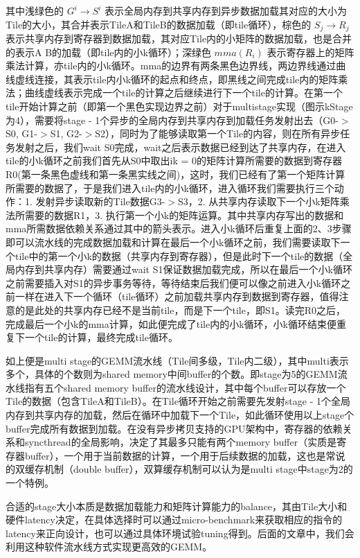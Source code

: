 其中浅绿色的 $G^i\rightarrow S^i$ 表示全局内存到共享内存到异步数据加载其对应的大小为Tile的大小，其合并表示TileA和TileB的数据加载（即tile循环），棕色的 $S_j \rightarrow R_j$ 表示共享内存到寄存器到数据加载，其对应Tile内的小矩阵的数据加载，也是合并的表示A B的加载（即tile内的小k循环）；深绿色 $mma(R_i)$ 表示寄存器上的矩阵乘法计算，亦tile内的小k循环。mma的边界有两条黑色边界线，两边界线通过曲线虚线连接，其表示tile内小k循环的起点和终点，即黑线之间完成tile内的矩阵乘法；曲线虚线表示完成一个tile的计算之后继续进行下一个tile的计算。在第一个tile开始计算之前（即第一个黑色实现边界之前）对于multistage实现（图示kStage为4），需要将stage - 1个异步的全局内存到共享内存到加载任务发射出去（G0-$>$S0, G1-$>$S1, G2-$>$S2），同时为了能够读取第一个Tile的内容，则在所有异步任务发射之后，我们wait S0完成，wait之后表示数据已经到达了共享内存，在进入tile的小k循环之前我们首先从S0中取出ik = 0的矩阵计算所需要的数据到寄存器R0(第一条黑色虚线和第一条黑实线之间)，这时，我们已经有了第一个矩阵计算所需要的数据了，于是我们进入tile内的小k循环，进入循环我们需要执行三个动作：1. 发射异步读取新的Tile数据G3-$>$S3，2. 从共享内存读取下一个小k矩阵乘法所需要的数据R1，3. 执行第一个小k的矩阵运算。其中共享内存写出的数据和mma所需数据依赖关系通过其中的箭头表示。进入小k循环后重复上面的2、3步骤即可以流水线的完成数据加载和计算在最后一个小k循环之前，我们需要读取下一个tile中的第一个小k的数据（共享内存到寄存器），但是此时下一个tile的数据（全局内存到共享内存）需要通过wait S1保证数据加载完成，所以在最后一个小k循环之前需要插入对S1的异步事务等待，等待结束后我们便可以像之前进入小k循环之前一样在进入下一个循环（tile循环）之前加载共享内存到数据到寄存器，值得注意的是此处的共享内存已经不是当前tile，而是下一个tile，即S1。读完R0之后，完成最后一个小k的mma计算，如此便完成了tile内的小k循环，小k循环结束便重复下一个tile的计算，最终完成tile循环。

如上便是multi stage的GEMM流水线（Tile间多级，Tile内二级），其中multi表示多个，具体的个数则为shared memory中间buffer的个数。即stage为5的GEMM流水线指有五个shared memory buffer的流水线设计，其中每个buffer可以存放一个Tile的数据（包含TileA和TileB）。在Tile循环开始之前需要先发射stage - 1个全局内存到共享内存的加载，然后在循环中加载下一个Tile，如此循环使用以上stage个buffer完成所有数据到加载。在没有异步拷贝支持的GPU架构中，寄存器的依赖关系和syncthread的全局影响，决定了其最多只能有两个memory buffer（实质是寄存器buffer），一个用于当前数据的计算，一个用于后续数据的加载，这也是常说的双缓存机制（double buffer），双算缓存机制可以认为是multi stage中stage为2的一个特例。

合适的stage大小本质是数据加载能力和矩阵计算能力的balance，其由Tile大小和硬件latency决定，在具体选择时可以通过micro-benchmark来获取相应的指令的latency来正向设计，也可以通过具体环境试验tuning得到。后面的文章中，我们会利用这种软件流水线方式实现更高效的GEMM。

